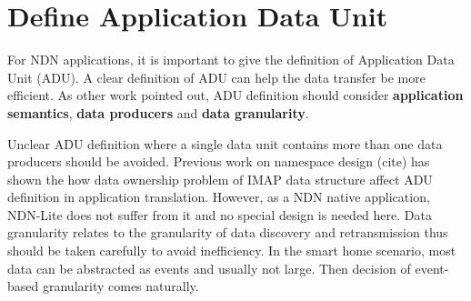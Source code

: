 \section{Define Application Data Unit}
\label{sec:application-data-unit}

For NDN applications, it is important to give the definition of Application Data Unit (ADU).
A clear definition of ADU can help the data transfer be more efficient.
As other work pointed out, ADU definition should consider \textbf{application semantics}, \textbf{data producers} and \textbf{data granularity}.

Unclear ADU definition where a single data unit contains more than one data producers should be avoided. 
Previous work on namespace design (cite) has shown the how data ownership problem of IMAP data structure affect ADU definition in application translation.
However, as a NDN native application, NDN-Lite does not suffer from it and no special design is needed here.
Data granularity relates to the granularity of data discovery and retransmission thus should be taken carefully to avoid inefficiency.
In the smart home scenario, most data can be abstracted as events and usually not large. 
Then decision of event-based granularity comes naturally.

